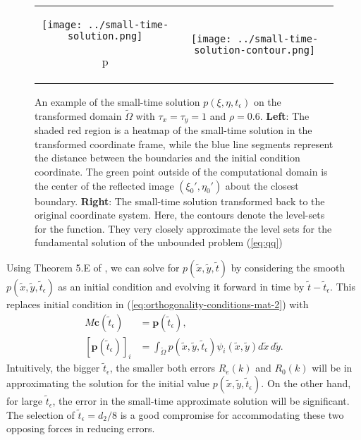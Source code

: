 \begin{figure}
  \centering
  \begin{tabular}{cc}
    \begin{minipage}{0.5\textwidth}
      \centering
      \texttt{[image: ../small-time-solution.png]}
    \end{minipage}p
    & \begin{minipage}{0.5\textwidth}
      \centering
      \texttt{[image: ../small-time-solution-contour.png]}
    \end{minipage}
  \end{tabular}
  \caption{An example of the small-time solution
    $p(\xi,\eta,t_\epsilon)$ on the transformed domain
    $\tilde{\Omega}$ with $\tau_x = \tau_y = 1$ and
    $\rho=0.6$. \textbf{Left}: The shaded red region is a heatmap of
    the small-time solution in the transformed coordinate frame, while
    the blue line segments represent the distance between the
    boundaries and the initial condition coordinate. The green point
    outside of the computational domain is the center of the reflected
    image $(\xi_0', \eta_0')$ about the closest
    boundary. \textbf{Right}: The small-time solution transformed back
    to the original coordinate system. Here, the contours denote the
    level-sets for the function. They very closely approximate the
    level sets for the fundamental solution of the unbounded problem
    (\ref{eq:qq})}
  \label{fig:step-1-small-time}
\end{figure}
Using Theorem 5.E of \cite{zeidler1995applied}, we can solve for
$p(\tilde{x},\tilde{y},\tilde{t})$ by considering the smooth
$p(\tilde{x},\tilde{y},\tilde{t}_\epsilon)$ as an initial condition
and evolving it forward in time by $\tilde{t} -
\tilde{t}_\epsilon$. This replaces initial condition in
(\ref{eq:orthogonality-conditions-mat-2}) with
\begin{align}
  M \mathbf{c}(\tilde{t}_\epsilon) &= \mathbf{p}(\tilde{t}_\epsilon), \\
  [\mathbf{p}(\tilde{t}_\epsilon)]_i &= \displaystyle \int_{\tilde{\Omega}} p(\tilde{x},\tilde{y},\tilde{t}_\epsilon) \psi_i(\tilde{x},\tilde{y}) d\tilde{x}\,d\tilde{y}. \nonumber
\end{align}
Intuitively, the bigger $\tilde{t}_\epsilon$, the smaller both errors
$R_e(k)$ and $R_0(k)$ will be in approximating the solution for the
initial value $p(\tilde{x},\tilde{y},\tilde{t}_\epsilon)$. On the
other hand, for large $\tilde{t}_\epsilon$, the error in the
small-time approximate solution will be significant. The selection of
$\tilde{t}_\epsilon = d_2/8$ is a good compromise for accommodating
these two opposing forces in reducing errors.




